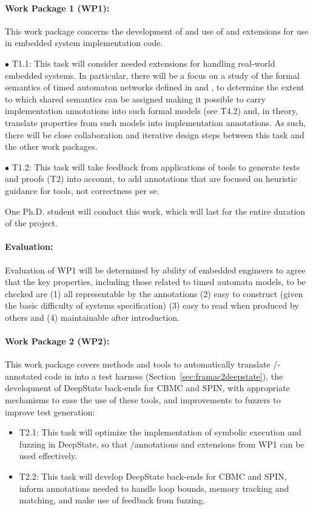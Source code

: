 \paragraph{Work Package 1 (WP1):}  This work package concerns the
development of and use of \acsl and \eacsl extensions for use in
embedded system implementation
code.


$\bullet$ T1.1: This task will consider needed extensions for handling
real-world embedded systems.  In particular, there will be a focus on
a study of the formal semantics of timed
automaton networks defined in \uppaal and \prism, to determine the
extent to which shared semantics can be assigned making it possible to
carry implementation annotations into such formal models (see T4.2)
and, in theory, translate properties from such models into implementation annotations.  As such, there will be close collaboration and iterative design steps between this task and the other work packages. %

$\bullet$ T1.2: This task will take feedback from applications of
tools to generate tests and proofs (T2) into account, to add annotations
that are focused on heuristic guidance for tools, not correctness per se.

One Ph.D. student will conduct this work, which will last for the entire duration of the project.

\paragraph{Evaluation:} Evaluation of
WP1 will be determined by ability of embedded engineers to agree that
the key properties, including those related to timed automata models, to be checked are (1) all representable by the
annotations (2) easy to construct (given the basic difficulty of
systems specification) (3) easy to read when produced by others and
(4) maintainable after introduction.

\paragraph{Work Package 2 (WP2):}  This work package covers
methods and tools to automatically translate \acsl/\eacsl-annotated code in
into a \deepstate test harness (Section~\ref{sec:framac2deepstate}),
the development of DeepState back-ends for CBMC and SPIN, with
appropriate mechanisms to ease the use of these tools, and
improvements to fuzzers to improve test generation:
\begin{itemize}[labelsep=3pt,leftmargin=12pt]
\item T2.1: This task will optimize the implementation of symbolic
  execution and fuzzing in DeepState, so that \acsl/\eacsl annotations
  and extensions from WP1 can be used effectively.
\item T2.2: This task will develop DeepState back-ends for CBMC and
  SPIN, inform annotations needed to handle loop bounds,
  memory tracking and matching, and make use of feedback from fuzzing.
\end{itemize}


